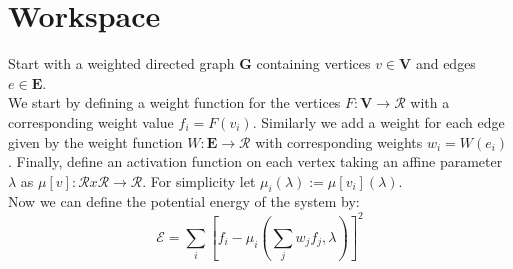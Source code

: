 \documentclass{article}
\begin{document}
\section*{Workspace}

Start with a weighted directed graph $\mathbf{G}$ containing vertices $v \in \mathbf{V}$ and edges $e \in \mathbf{E}$. \\

We start by defining a weight function for the vertices $F: \mathbf{V} \rightarrow \mathcal{R}$ with a corresponding weight value $f_i = F(v_i)$. 
Similarly we add a weight for each edge given by the weight function $W: \mathbf{E} \rightarrow \mathcal{R}$ with corresponding weights $w_i = W(e_i)$. 
Finally, define an activation function on each vertex taking an affine parameter $\lambda$ as $\mu\left[v\right]: \mathcal{R} x \mathcal{R} \rightarrow \mathcal{R}$. 
For simplicity let $\mu_i(\lambda) := \mu[v_i](\lambda)$.\\

Now we can define the potential energy of the system by:
\begin{equation}
\mathcal{E} = \sum_{i}\left[f_i - \mu_i(\sum_jw_jf_j, \lambda)\right]^2
\end{equation}
\end{document}
